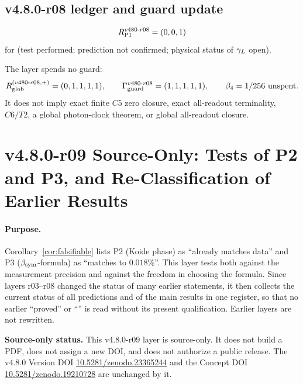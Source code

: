 \subsection*{v4.8.0-r08 ledger and guard update}
\label{subsec:v480-r08-ledger-guard}

\[
R_{\rm P1}^{v480\text{-}r08}=(0,0,1)
\]
for (test performed; prediction not confirmed; physical status of \(\gamma_L\) open).

The layer spends no guard:
\[
R_{\rm glob}^{(v480\text{-}r08,+)}=(0,1,1,1,1),
\qquad
\Gamma_{\rm guard}^{v480\text{-}r08}=(1,1,1,1,1),
\qquad
\beta_4=1/256\ \text{unspent}.
\]
It does not imply exact finite \(C5\) zero closure, exact all-readout terminality,
\(C6/T2\), a global photon-clock theorem, or global all-readout closure.


\clearpage
\section*{v4.8.0-r09 Source-Only: Tests of P2 and P3, and Re-Classification of Earlier Results}
\label{sec:v480-r09-p2-p3-reclassification}

\paragraph{Purpose.}
Corollary~\ref{cor:falsifiable} lists P2 (Koide phase) as ``already matches data'' and P3
(\(\beta_{\mathrm{sym}}\)-formula) as ``matches to \(0.018\%\)''.  This layer tests both against the measurement
precision and against the freedom in choosing the formula.  Since layers r03--r08 changed the status
of many earlier statements, it then collects the current status of all predictions and of the main
results in one register, so that no earlier ``proved'' or ``\checkmark'' is read without its
present qualification.  Earlier layers are not rewritten.

\noindent\textbf{Source-only status.}
This v4.8.0-r09 layer is source-only.  It does not build a PDF, does not assign a new DOI,
and does not authorize a public release.  The v4.8.0 Version DOI
\href{https://doi.org/10.5281/zenodo.23365244}{10.5281/zenodo.23365244} and the Concept DOI
\href{https://doi.org/10.5281/zenodo.19210728}{10.5281/zenodo.19210728} are unchanged by it.

